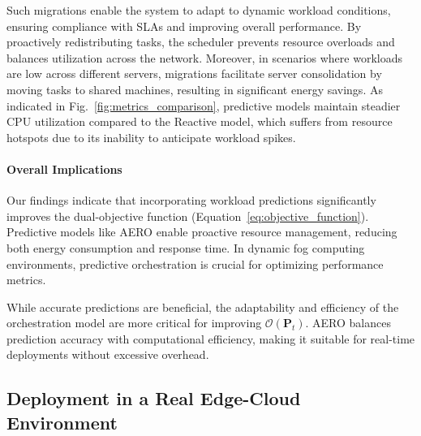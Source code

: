 \documentclass{ieeetmlcn}
\begin{document}
Such migrations enable the system to adapt to dynamic workload conditions, ensuring compliance with SLAs and improving overall performance. By proactively redistributing tasks, the scheduler prevents resource overloads and balances utilization across the network. Moreover, in scenarios where workloads are low across different servers, migrations facilitate server consolidation by moving tasks to shared machines, resulting in significant energy savings. As indicated in Fig.~\ref{fig:metrics_comparison}, predictive models maintain steadier CPU utilization compared to the Reactive model, which suffers from resource hotspots due to its inability to anticipate workload spikes.


\paragraph*{Overall Implications}

Our findings indicate that incorporating workload predictions significantly improves the dual-objective function (Equation~\eqref{eq:objective_function}). Predictive models like AERO enable proactive resource management, reducing both energy consumption and response time. In dynamic fog computing environments, predictive orchestration is crucial for optimizing performance metrics.

While accurate predictions are beneficial, the adaptability and efficiency of the orchestration model are more critical for improving $\mathcal{O}(\mathbf{P}_t)$. AERO balances prediction accuracy with computational efficiency, making it suitable for real-time deployments without excessive overhead.

\subsection{Deployment in a Real Edge-Cloud Environment}
\label{sec:live_deployment}
\end{document}
